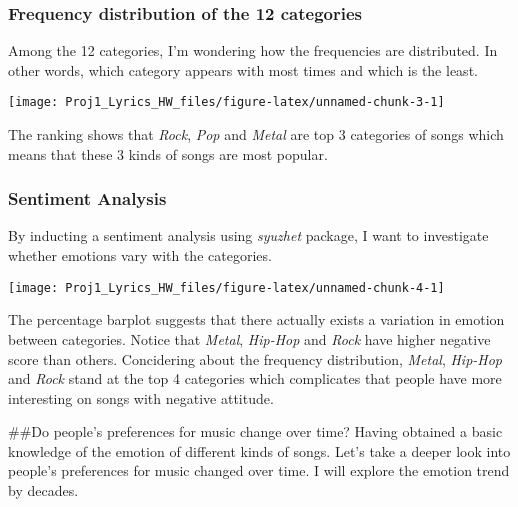 \documentclass[]{article}
\begin{document}
\hypertarget{frequency-distribution-of-the-12-categories}{%
\subsubsection{Frequency distribution of the 12
categories}\label{frequency-distribution-of-the-12-categories}}

Among the 12 categories, I'm wondering how the frequencies are
distributed. In other words, which category appears with most times and
which is the least.

\begin{center}\texttt{[image: Proj1\_Lyrics\_HW\_files/figure-latex/unnamed-chunk-3-1]} \end{center}

The ranking shows that \emph{Rock}, \emph{Pop} and \emph{Metal} are top
3 categories of songs which means that these 3 kinds of songs are most
popular.

\hypertarget{sentiment-analysis}{%
\subsubsection{Sentiment Analysis}\label{sentiment-analysis}}

By inducting a sentiment analysis using \emph{syuzhet} package, I want
to investigate whether emotions vary with the categories.

\begin{center}\texttt{[image: Proj1\_Lyrics\_HW\_files/figure-latex/unnamed-chunk-4-1]} \end{center}

The percentage barplot suggests that there actually exists a variation
in emotion between categories. Notice that \emph{Metal}, \emph{Hip-Hop}
and \emph{Rock} have higher negative score than others. Concidering
about the frequency distribution, \emph{Metal}, \emph{Hip-Hop} and
\emph{Rock} stand at the top 4 categories which complicates that people
have more interesting on songs with negative attitude.

\#\#Do people's preferences for music change over time? Having obtained
a basic knowledge of the emotion of different kinds of songs. Let's take
a deeper look into people's preferences for music changed over time. I
will explore the emotion trend by decades.
\end{document}
